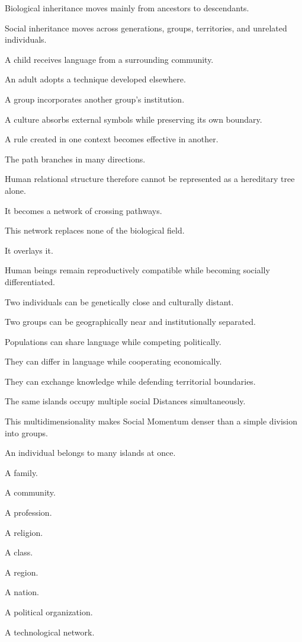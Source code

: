 Biological inheritance moves mainly from ancestors to descendants.

Social inheritance moves across generations, groups, territories, and unrelated individuals.

A child receives language from a surrounding community.

An adult adopts a technique developed elsewhere.

A group incorporates another group’s institution.

A culture absorbs external symbols while preserving its own boundary.

A rule created in one context becomes effective in another.

The path branches in many directions.

Human relational structure therefore cannot be represented as a hereditary tree alone.

It becomes a network of crossing pathways.

This network replaces none of the biological field.

It overlays it.

Human beings remain reproductively compatible while becoming socially differentiated.

Two individuals can be genetically close and culturally distant.

Two groups can be geographically near and institutionally separated.

Populations can share language while competing politically.

They can differ in language while cooperating economically.

They can exchange knowledge while defending territorial boundaries.

The same islands occupy multiple social Distances simultaneously.

This multidimensionality makes Social Momentum denser than a simple division into groups.

An individual belongs to many islands at once.

A family.

A community.

A profession.

A religion.

A class.

A region.

A nation.

A political organization.

A technological network.

